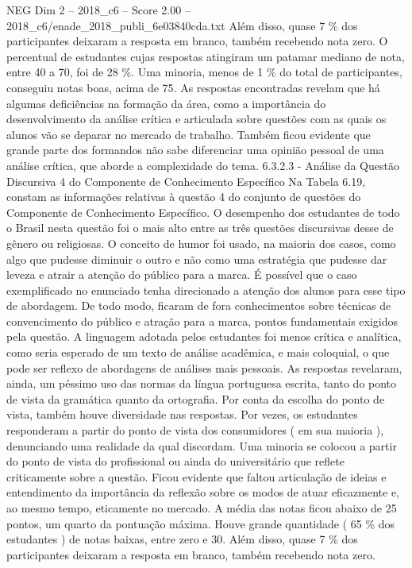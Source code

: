 \begin{textsample}{NEG Dim 2 – 2018\_c6 – Score 2.00 – 2018\_c6/enade\_2018\_publi\_6e03840cda.txt}
Além disso, quase 7 \% dos participantes deixaram a resposta em branco, também recebendo nota zero.
O percentual de estudantes cujas respostas atingiram um patamar mediano de nota, entre 40 a 70, foi de 28 \%.
Uma minoria, menos de 1 \% do total de participantes, conseguiu notas boas, acima de 75.
As respostas encontradas revelam que há algumas deficiências na formação da área, como a importância do desenvolvimento da análise crítica e articulada sobre questões com as quais os alunos vão se deparar no mercado de trabalho.
Também ficou evidente que grande parte dos formandos não sabe diferenciar uma opinião pessoal de uma análise crítica, que aborde a complexidade do tema. 6.3.2.3 - Análise da Questão Discursiva 4 do Componente de Conhecimento Específico Na Tabela 6.19, constam as informações relativas à questão 4 do conjunto de questões do Componente de Conhecimento Específico.
O desempenho dos estudantes de todo o Brasil nesta questão foi o mais alto entre as três questões discursivas desse de gênero ou religiosas.
O conceito de humor foi usado, na maioria dos casos, como algo que pudesse diminuir o outro e não como uma estratégia que pudesse dar leveza e atrair a atenção do público para a marca.
É possível que o caso exemplificado no enunciado tenha direcionado a atenção dos alunos para esse tipo de abordagem.
De todo modo, ficaram de fora conhecimentos sobre técnicas de convencimento do público e atração para a marca, pontos fundamentais exigidos pela questão.
A linguagem adotada pelos estudantes foi menos crítica e analítica, como seria esperado de um texto de análise acadêmica, e mais coloquial, o que pode ser reflexo de abordagens de análises mais pessoais.
As respostas revelaram, ainda, um péssimo uso das normas da língua portuguesa escrita, tanto do ponto de vista da gramática quanto da ortografia.
Por conta da escolha do ponto de vista, também houve diversidade nas respostas.
Por vezes, os estudantes responderam a partir do ponto de vista dos consumidores ( em sua maioria ), denunciando uma realidade da qual discordam.
Uma minoria se colocou a partir do ponto de vista do profissional ou ainda do universitário que reflete criticamente sobre a questão.
Ficou evidente que faltou articulação de ideias e entendimento da importância da reflexão sobre os modos de atuar eficazmente e, ao mesmo tempo, eticamente no mercado.
A média das notas ficou abaixo de 25 pontos, um quarto da pontuação máxima.
Houve grande quantidade ( 65 \% dos estudantes ) de notas baixas, entre zero e 30.
Além disso, quase 7 \% dos participantes deixaram a resposta em branco, também recebendo nota zero.

\end{textsample}
